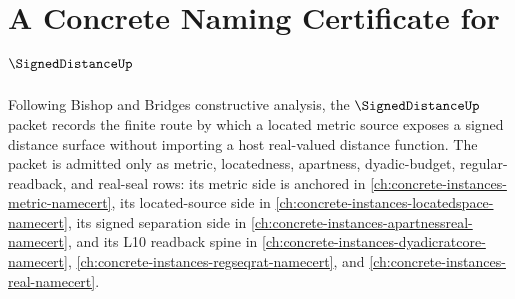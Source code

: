 \chapter{A Concrete Naming Certificate for $\SignedDistanceUp$}
\label{ch:concrete-instances-signed-distance-namecert}

Following Bishop and Bridges constructive analysis, the $\SignedDistanceUp$ packet records the finite route by which a located metric source exposes a signed distance surface without importing a host real-valued distance function. The packet is admitted only as metric, locatedness, apartness, dyadic-budget, regular-readback, and real-seal rows: its metric side is anchored in \autoref{ch:concrete-instances-metric-namecert}, its located-source side in \autoref{ch:concrete-instances-locatedspace-namecert}, its signed separation side in \autoref{ch:concrete-instances-apartnessreal-namecert}, and its L10 readback spine in \autoref{ch:concrete-instances-dyadicratcore-namecert}, \autoref{ch:concrete-instances-regseqrat-namecert}, and \autoref{ch:concrete-instances-real-namecert}.

